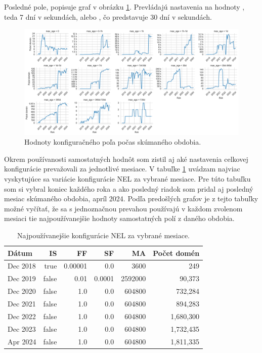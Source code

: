 Posledné pole,  popisuje graf v obrázku \ref{fig:httparchive-nel-config-ma-dist}.
Prevládajú nastavenia na hodnoty , teda 7 dní v sekundách, alebo , čo predstavuje 30 dní v sekundách.

\begin{figure}[!htb]
\begin{center}
 \includegraphics[scale=0.447]{obrazky-figures/httparchive_nel_config_ma_dist.pdf}
 \caption{Hodnoty konfiguračného poľa  počas skúmaného obdobia.}
 \label{fig:httparchive-nel-config-ma-dist}
\end{center}
\end{figure}

Okrem používanosti samostatných hodnôt som zistil aj aké nastavenia celkovej konfigurácie prevažovali za jednotlivé mesiace.
V tabuľke \ref{tab:nel_config_popular_annual_config} uvádzam najviac vyskytujúce sa variácie konfigurácie NEL za vybrané mesiace.
Pre túto tabuľku som si vybral koniec každého roka a ako posledný riadok som pridal aj posledný mesiac skúmaného obdobia, apríl 2024.
Podľa predošlých grafov je z tejto tabuľky možné vyčítať, že sa s jednoznačnou prevahou používajú v každom zvolenom mesiaci tie najpoužívanejšie hodnoty samostatných polí z daného obdobia.

\begin{table}[!htb]
\centering
\begin{tabular}{l||r|r|r|r|r}
\toprule
Dátum & IS & FF & SF & MA & Počet domén \\
\midrule
\midrule
Dec 2018 & true & 0.00001 & 0.0 & 3600 & 249 \\
Dec 2019 & false & 0.01 & 0.0001 & 2592000 & 90,373 \\
Dec 2020 & false & 1.0 & 0.0 & 604800 & 732,284 \\
Dec 2021 & false & 1.0 & 0.0 & 604800 & 894,283 \\
Dec 2022 & false & 1.0 & 0.0 & 604800 & 1,680,300 \\
Dec 2023 & false & 1.0 & 0.0 & 604800 & 1,732,435 \\
Apr 2024 & false & 1.0 & 0.0 & 604800 & 1,811,335 \\
\bottomrule
\end{tabular}
\label{tab:nel_config_popular_annual_config}
\caption{Najpoužívanejšie konfigurácie NEL za vybrané mesiace.}
\end{table}


